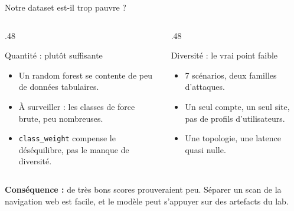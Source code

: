 \documentclass[aspectratio=169,11pt,xcolor=table]{beamer}
\begin{document}
\begin{frame}{Notre dataset est-il trop pauvre ?}
  \begin{columns}[T]
    \begin{column}{.48\linewidth}
      \begin{block}{Quantité : plutôt suffisante}
        \begin{itemize}
          \item Un random forest se contente de peu de données tabulaires.
          \item À surveiller : les classes de force brute, peu nombreuses.
          \item \texttt{class\_weight} compense le déséquilibre, pas le manque de diversité.
        \end{itemize}
      \end{block}
    \end{column}
    \begin{column}{.48\linewidth}
      \begin{block}{Diversité : le vrai point faible}
        \begin{itemize}
          \item 7 scénarios, deux familles d'attaques.
          \item Un seul compte, un seul site, pas de profils d'utilisateurs.
          \item Une topologie, une latence quasi nulle.
        \end{itemize}
      \end{block}
    \end{column}
  \end{columns}
  \vfill
  \textbf{Conséquence :} de très bons scores prouveraient peu. Séparer un scan de la navigation web est facile, et le modèle peut s'appuyer sur des artefacts du lab.
\end{frame}
\end{document}
